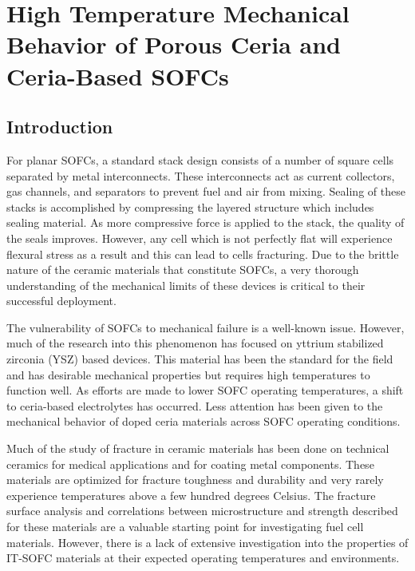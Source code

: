 


\chapter{High Temperature Mechanical Behavior of Porous Ceria and Ceria-Based SOFCs}

\section{Introduction}
For planar SOFCs, a standard stack design consists of a number of square cells separated by metal interconnects.\cite{Ki2010}
These interconnects act as current collectors, gas channels, and separators to prevent fuel and air from mixing.
Sealing of these stacks is accomplished by compressing the layered structure which includes sealing material.
As more compressive force is applied to the stack, the quality of the seals improves.
However, any cell which is not perfectly flat will experience flexural stress as a result and this can lead to cells fracturing.
Due to the brittle nature of the ceramic materials that constitute SOFCs, a very thorough understanding of the mechanical limits of these devices is critical to their successful deployment.

The vulnerability of SOFCs to mechanical failure is a well-known issue.
However, much of the research into this phenomenon has focused on yttrium stabilized zirconia (YSZ) based devices.\cite{Roa2011,Yu2007,Nakajo2012}
This material has been the standard for the field and has desirable mechanical properties but requires high temperatures to function well.
As efforts are made to lower SOFC operating temperatures, a shift to ceria-based electrolytes has occurred.
Less attention has been given to the mechanical behavior of doped ceria materials across SOFC operating conditions.

Much of the study of fracture in ceramic materials has been done on technical ceramics for medical applications and for coating metal components.\cite{Deng2004,Ambrozic2007,Yonezu2014,Meille2012,Nie2010,Olagnon1999,Sorensen2001,Barinov1997}
These materials are optimized for fracture toughness and durability and very rarely experience temperatures above a few hundred degrees Celsius.
The fracture surface analysis and correlations between microstructure and strength described for these materials are a valuable starting point for investigating fuel cell materials.
However, there is a lack of extensive investigation into the properties of IT-SOFC materials at their expected operating temperatures and environments.

